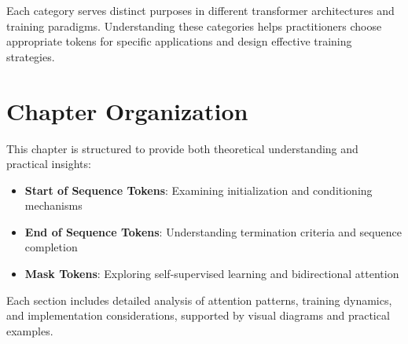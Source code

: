 Each category serves distinct purposes in different transformer architectures and training paradigms. Understanding these categories helps practitioners choose appropriate tokens for specific applications and design effective training strategies.

\section{Chapter Organization}

This chapter is structured to provide both theoretical understanding and practical insights:

\begin{itemize}
\item \textbf{Start of Sequence Tokens}: Examining initialization and conditioning mechanisms
\item \textbf{End of Sequence Tokens}: Understanding termination criteria and sequence completion
\item \textbf{Mask Tokens}: Exploring self-supervised learning and bidirectional attention
\end{itemize}

Each section includes detailed analysis of attention patterns, training dynamics, and implementation considerations, supported by visual diagrams and practical examples.